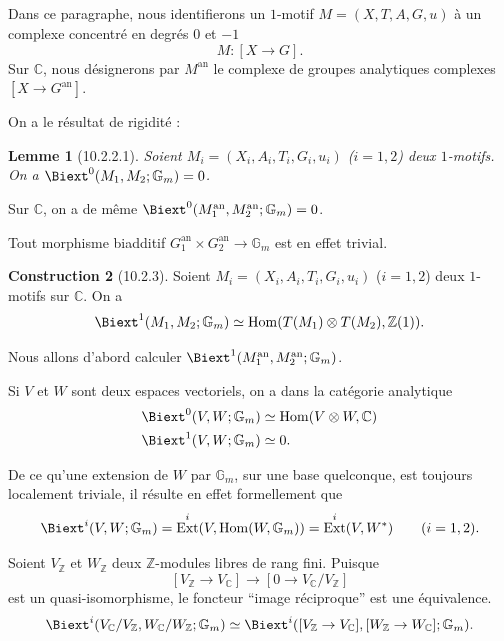\documentclass[12pt,a4paper]{amsart}
\theoremstyle{plain}
\newtheorem{lemme}{Lemme}[section]
\theoremstyle{definition}
\newtheorem{construction}[lemme]{Construction}
\theoremstyle{remark}
\DeclareMathOperator{\Hom}{Hom}
\DeclareMathOperator{\Ext}{Ext}
\numberwithin{equation}{section}
\begin{document}
\subsection{}\label{10.2.2}
Dans ce paragraphe, nous identifierons un $1$-motif $M=(X,T,A,G,u)$ à un complexe concentré en degrés $0$ et $-1$
\[
M:[X\to G].
\]
Sur $\mathbb{C}$, nous désignerons par $M^\mathrm{an}$ le complexe de groupes analytiques complexes $[X\to G^\mathrm{an}]$.

On a le résultat de rigidité :

\begin{lemme}[10.2.2.1]\label{lemme:10.2.2.1}
Soient $M_i=(X_i,A_i,T_i,G_i,u_i)$ ($i=1,2$) deux $1$-motifs. On a $\Biext^0(M_1,M_2;\mathbb{G}_m)=0$.
\end{lemme}

Sur $\mathbb{C}$, on a de même $\Biext^0(M_1^\mathrm{an},M_2^\mathrm{an};\mathbb{G}_m)=0$.

Tout morphisme biadditif $G_1^\mathrm{an}\times G_2^\mathrm{an}\to\mathbb{G}_m$ est en effet trivial.

\begin{construction}[10.2.3]\label{cons:10.2.3}
Soient $M_i=(X_i,A_i,T_i,G_i,u_i)$ ($i=1,2$) deux $1$-motifs sur $\mathbb{C}$. On a
\[
\Biext^1(M_1,M_2;\mathbb{G}_m)\simeq\Hom(T(M_1)\otimes T(M_2),\mathbb{Z}(1)).
\]
\end{construction}

Nous allons d'abord calculer $\Biext^1(M_1^\mathrm{an},M_2^\mathrm{an};\mathbb{G}_m)$.

Si $V$ et $W$ sont deux espaces vectoriels, on a dans la catégorie analytique
\begin{align}
\label{eq:10.2.3.1}\Biext^0(V,W;\mathbb{G}_m) &\simeq \Hom(V\otimes W,\mathbb{C}) \\
\label{eq:10.2.3.2}\Biext^1(V,W;\mathbb{G}_m) &\simeq 0.
\end{align}

De ce qu'une extension de $W$ par $\mathbb{G}_m$, sur une base quelconque, est toujours localement triviale, il résulte en effet formellement que
\[
\Biext^i(V,W;\mathbb{G}_m) = \Ext^i(V,\Hom(W,\mathbb{G}_m)) = \Ext^i(V,W^*) \qquad (i=1,2).
\]

Soient $V_\mathbb{Z}$ et $W_\mathbb{Z}$ deux $\mathbb{Z}$-modules libres de rang fini. Puisque
\[
[V_\mathbb{Z}\to V_\mathbb{C}]\to[0\to V_\mathbb{C}/V_\mathbb{Z}]
\]
est un quasi-isomorphisme, le foncteur ``image réciproque'' est une équivalence.
\begin{equation}\label{eq:10.2.3.3}
\Biext^i(V_\mathbb{C}/V_\mathbb{Z},W_\mathbb{C}/W_\mathbb{Z};\mathbb{G}_m)\simeq\Biext^i([V_\mathbb{Z}\to V_\mathbb{C}],[W_\mathbb{Z}\to W_\mathbb{C}];\mathbb{G}_m).
\end{equation}
\end{document}
